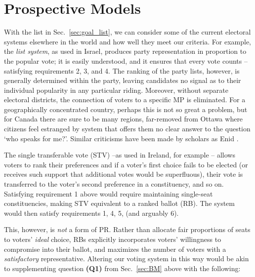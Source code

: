 
\section{Prospective Models}
\label{sec:alt_models}

With the list in Sec.~\ref{sec:goal_list}, we can consider some of the current electoral systems elsewhere in the world and how well they meet our criteria. For example, the \emph{list system}, as used in Israel, produces party representation in proportion to the popular vote; it is easily understood, and it ensures that every vote counts \---satisfying requirements 2, 3, and 4.
The ranking of the party lists, however, is generally determined within the party, leaving candidates no signal as to their individual popularity in any particular riding. Moreover, without separate electoral districts, the connection of voters to a specific MP is eliminated.
For a geographically concentrated country, perhaps this is not so great a problem, but for Canada there are sure to be many regions, far-removed from Ottawa where citizens feel estranged by system that offers them no clear answer to the question `who speaks for me?'. Similar criticisms have been made by scholars as Enid \citet{Lakeman}.

The single transferable vote (STV) \---as used in Ireland, for example \citep{Gallagher_2005}
\--- allows voters to  rank their preferences and if a voter's first choice fails to be elected (or receives such support that additional votes would be superfluous), their vote is transferred to the voter's second preference in a constituency, and so on.
Satisfying requirement 1 above would require maintaining single-seat constituencies, making STV equivalent to a ranked ballot (RB). The system would then satisfy requirements 1, 4, 5, (and arguably 6).

This, however, is \emph{not} a form of PR.
Rather than allocate fair proportions of seats to voters' \emph{ideal} choice, RBs explicitly incorporates voters' willingness to compromise into their ballot, and maximizes the number of voters with a \emph{satisfactory} representative.
Altering our voting system in this way would be akin to supplementing question \textbf{(Q1)} from Sec.~\ref{sec:BM} above with the following:

